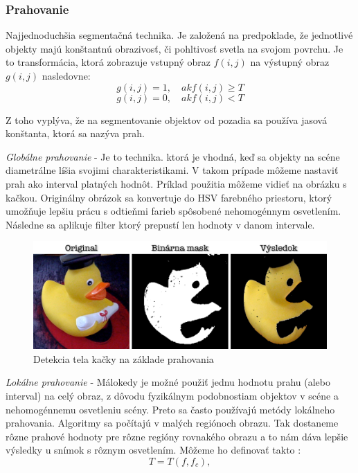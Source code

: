 \subsubsection{Prahovanie}
Najjednoduchšia segmentačná technika. Je založená na predpoklade, že jednotlivé objekty majú konštantnú obrazivosť, či pohltivosť svetla na svojom povrchu. Je to transformácia, ktorá zobrazuje vstupný obraz $f(i, j)$ na výstupný obraz $g(i, j)$ nasledovne: 
$$g (i{,}j)=1 {,}\quad {ak} f(i{,}j)\ge T$$
$$g (i{,}j)=0 {,}\quad {ak} f(i{,}j)  < T$$


Z toho vyplýva, že na segmentovanie objektov od pozadia sa používa jasová konštanta, ktorá sa nazýva prah. 


\textit{Globálne prahovanie} - Je to technika. ktorá je vhodná, keď sa objekty na scéne diametrálne líšia svojimi charakteristikami. V takom prípade môžeme nastaviť prah ako interval platných hodnôt. Príklad použitia môžeme vidieť na obrázku s kačkou. Originálny obrázok sa konvertuje do HSV farebného priestoru, ktorý umožňuje lepšiu prácu s odtieňmi farieb spôsobené nehomogénnym osvetlením. Následne sa aplikuje filter ktorý prepustí len hodnoty v danom intervale.

\begin{figure}[H]
\begin{center}
	\includegraphics[scale=0.25]{obrazky/prahovanie}
	\caption{Detekcia tela kačky na základe prahovania}
	\end{center}
\end{figure}


\textit{Lokálne prahovanie} - Málokedy je možné použiť jednu hodnotu prahu (alebo interval) na celý obraz, z dôvodu fyzikálnym podobnostiam objektov v scéne a  nehomogénnemu osvetleniu scény. Preto sa často používajú metódy lokálneho prahovania. Algoritmy sa počítajú v malých regiónoch obrazu. Tak dostaneme rôzne prahové hodnoty pre rôzne regióny rovnakého obrazu a to nám dáva lepšie výsledky u snímok s rôznym osvetlením. Môžeme ho definovať takto : 
$$T=T(f {,} f_c){,}$$

